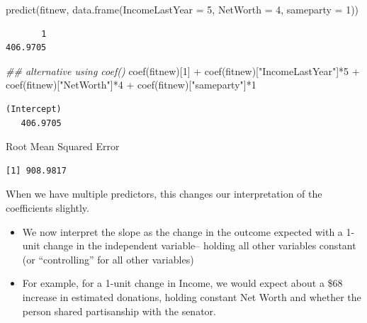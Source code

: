 \documentclass[
  letterpaper,
  DIV=11,
  numbers=noendperiod]{scrreprt}
\newenvironment{Shaded}{\begin{snugshade}}{\end{snugshade}}
\newcommand{\AttributeTok}[1]{\textcolor[rgb]{0.40,0.45,0.13}{#1}}
\newcommand{\DecValTok}[1]{\textcolor[rgb]{0.68,0.00,0.00}{#1}}
\newcommand{\DocumentationTok}[1]{\textcolor[rgb]{0.37,0.37,0.37}{\textit{#1}}}
\newcommand{\FunctionTok}[1]{\textcolor[rgb]{0.28,0.35,0.67}{#1}}
\newcommand{\NormalTok}[1]{\textcolor[rgb]{0.00,0.23,0.31}{#1}}
\newcommand{\SpecialCharTok}[1]{\textcolor[rgb]{0.37,0.37,0.37}{#1}}
\newcommand{\StringTok}[1]{\textcolor[rgb]{0.13,0.47,0.30}{#1}}
\providecommand{\tightlist}{%
  \setlength{\itemsep}{0pt}\setlength{\parskip}{0pt}}\usepackage{longtable,booktabs,array}
\begin{document}
\begin{Shaded}
\begin{Highlighting}[]
\FunctionTok{predict}\NormalTok{(fitnew, }\FunctionTok{data.frame}\NormalTok{(}\AttributeTok{IncomeLastYear =} \DecValTok{5}\NormalTok{, }\AttributeTok{NetWorth =} \DecValTok{4}\NormalTok{, }\AttributeTok{sameparty =} \DecValTok{1}\NormalTok{))}
\end{Highlighting}
\end{Shaded}

\begin{verbatim}
       1 
406.9705 
\end{verbatim}

\begin{Shaded}
\begin{Highlighting}[]
\DocumentationTok{\#\# alternative using coef()}
\FunctionTok{coef}\NormalTok{(fitnew)[}\DecValTok{1}\NormalTok{] }\SpecialCharTok{+} \FunctionTok{coef}\NormalTok{(fitnew)[}\StringTok{"IncomeLastYear"}\NormalTok{]}\SpecialCharTok{*}\DecValTok{5} \SpecialCharTok{+} 
  \FunctionTok{coef}\NormalTok{(fitnew)[}\StringTok{"NetWorth"}\NormalTok{]}\SpecialCharTok{*}\DecValTok{4} \SpecialCharTok{+} \FunctionTok{coef}\NormalTok{(fitnew)[}\StringTok{"sameparty"}\NormalTok{]}\SpecialCharTok{*}\DecValTok{1}
\end{Highlighting}
\end{Shaded}

\begin{verbatim}
(Intercept) 
   406.9705 
\end{verbatim}

Root Mean Squared Error

\begin{Shaded}
\end{Shaded}

\begin{verbatim}
[1] 908.9817
\end{verbatim}

When we have multiple predictors, this changes our interpretation of the
coefficients slightly.

\begin{itemize}
\tightlist
\item
  We now interpret the slope as the change in the outcome expected with
  a 1-unit change in the independent variable-- holding all other
  variables constant (or ``controlling'' for all other variables)
\item
  For example, for a 1-unit change in Income, we would expect about a
  \$68 increase in estimated donations, holding constant Net Worth and
  whether the person shared partisanship with the senator.
\end{itemize}
\end{document}
